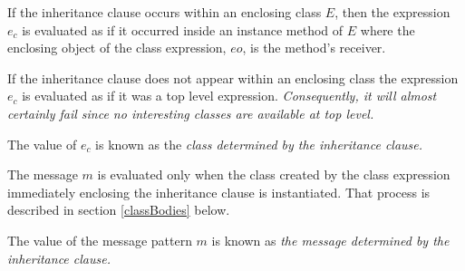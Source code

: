 \documentclass{article}
\begin{document}
If the inheritance clause occurs within an enclosing class $E$, then the expression $e_c$ is evaluated as if it occurred inside an instance method of $E$ where the enclosing object of the class expression, $eo$, is the method's receiver. 


If the inheritance clause does not appear within an enclosing class the expression $e_c$ is evaluated as if it was a top level expression. 
{\em 
Consequently, it will almost certainly fail since no interesting classes are available at top level.
}

The value of $e_c$ is known as the {\em class determined by the inheritance clause.}

The message $m$ is evaluated only when the class created by the class expression immediately enclosing the inheritance clause is instantiated.
That process is described in section \ref{classBodies} below.

The value of the message pattern $m$  is known as {\em the message determined by the inheritance clause.}

 


\end{document}
